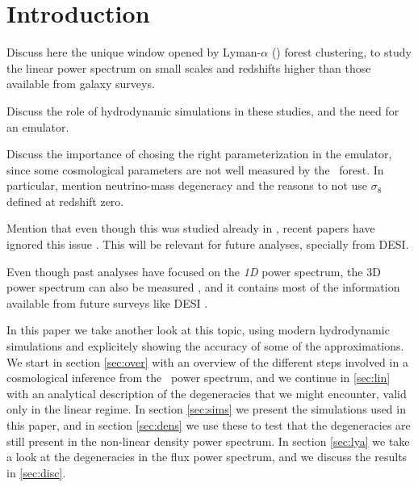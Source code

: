 \section{Introduction} 

Discuss here the unique window opened by Lyman-$\alpha$ (\lya) forest 
clustering, to study the linear power spectrum on small scales and redshifts 
higher than those available from galaxy surveys.

Discuss the role of hydrodynamic simulations in these studies, and the need 
for an emulator.

Discuss the importance of chosing the right parameterization in the emulator, 
since some cosmological parameters are not well measured by the \lya\ forest.
In particular, mention neutrino-mass degeneracy and the reasons to not use 
$\sigma_8$ defined at redshift zero.

Mention that even though this was studied already in \cite{McDonald2005a}, 
recent papers have ignored this issue \cite{Palanque-Delabrouille2015,
Yeche2017}. 
This will be relevant for future analyses, specially from DESI.

Even though past analyses have focused on the \textit{1D} power spectrum, 
the 3D power spectrum can also be measured \cite{Font-Ribera2018}, 
and it contains most of the information available from future surveys 
like DESI \cite{Font-Ribera2014}. 

In this paper we take another look at this topic, using modern hydrodynamic 
simulations and explicitely showing the accuracy of some of the approximations.
We start in section \ref{sec:over} with an overview of the different steps 
involved in a cosmological inference from the \lya\ power spectrum, and we 
continue in \ref{sec:lin} with an analytical description of the degeneracies
that we might encounter, valid only in the linear regime.
In section \ref{sec:sims} we present the simulations used in this paper, and 
in section \ref{sec:dens} we use these to test that the degeneracies are 
still present in the non-linear density power spectrum. 
In section \ref{sec:lya} we take a look at the degeneracies in the flux 
power spectrum, and we discuss the results in \ref{sec:disc}.

 
